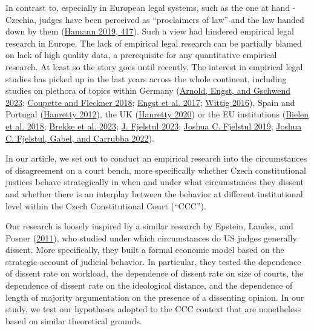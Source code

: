 \documentclass[
  11pt,
]{article}
\begin{document}
In contrast to, especially in European legal systems, such as the one at
hand - Czechia, judges have been perceived as ``proclaimers of law'' and
the law handed down by them
(\protect\hyperlink{ref-hamannGermanFederalCourts2019}{Hamann 2019,
417}). Such a view had hindered empirical legal research in Europe. The
lack of empirical legal research can be partially blamed on lack of high
quality data, a prerequisite for any quantitative empirical research. At
least so the story goes until recently. The interest in empirical legal
studies has picked up in the last years across the whole continent,
including studies on plethora of topics within Germany
(\protect\hyperlink{ref-arnoldScalingCourtDecisions2023}{Arnold, Engst,
and Gschwend 2023};
\protect\hyperlink{ref-coupetteQuantitativeRechtswissenschaft2018}{Coupette
and Fleckner 2018};
\protect\hyperlink{ref-engstEinflussParteinaheAuf2017}{Engst et al.
2017};
\protect\hyperlink{ref-wittigOccurrenceSeparateOpinions2016}{Wittig
2016}), Spain and Portugal
(\protect\hyperlink{ref-hanrettyDissentIberiaIdeal2012}{Hanretty 2012}),
the UK
(\protect\hyperlink{ref-hanrettyCourtSpecialistsJudicial2020}{Hanretty
2020}) or the EU institutions
(\protect\hyperlink{ref-bielenBacklogsLitigationRates2018}{Bielen et al.
2018}; \protect\hyperlink{ref-brekkeThatOrderHow2023}{Brekke et al.
2023}; \protect\hyperlink{ref-fjelstulHowChamberSystem2023}{J. Fjelstul
2023}; \protect\hyperlink{ref-fjelstulEvolutionEuropeanUnion2019}{Joshua
C. Fjelstul 2019};
\protect\hyperlink{ref-fjelstulTimelyAdministrationJustice2022}{Joshua
C. Fjelstul, Gabel, and Carrubba 2022}).

In our article, we set out to conduct an empirical research into the
circumstances of disagreement on a court bench, more specifically
whether Czech constitutional justices behave strategically in when and
under what circumstances they dissent and whether there is an interplay
between the behavior at different institutional level within the Czech
Constitutional Court (``CCC'').

Our research is loosely inspired by a similar research by Epstein,
Landes, and Posner
(\protect\hyperlink{ref-epsteinWhyWhenJudges2011}{2011}), who studied
under which circumstances do US judges generally dissent. More
specifically, they built a formal economic model based on the strategic
account of judicial behavior. In particular, they tested the dependence
of dissent rate on workload, the dependence of dissent rate on size of
courts, the dependence of dissent rate on the ideological distance, and
the dependence of length of majority argumentation on the presence of a
dissenting opinion. In our study, we test our hypotheses adopted to the
CCC context that are nonetheless based on similar theoretical grounds.
\end{document}
